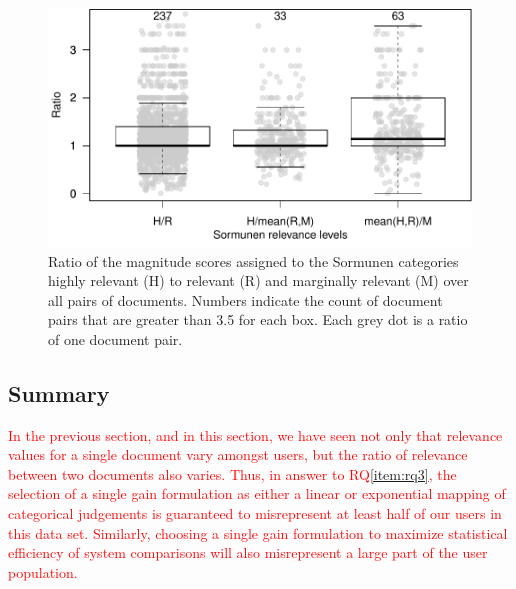 \begin{figure}[t]
  \centering
  \includegraphics[width=.7\linewidth]{figs/kanoulos_aslam.pdf}
  \caption{Ratio of the magnitude scores assigned to 
    the Sormunen categories highly relevant (H) to relevant (R) and marginally relevant
    (M) over all pairs of documents. Numbers indicate the count of document pairs that 
    are greater than 3.5 for each box. Each grey dot is a ratio of one document pair.
  \label{fig:ka}
    }
\end{figure}

\subsection{Summary}

\textcolor{red}{
In the previous section, and in this section, we have seen not only 
that relevance values for a single document vary amongst users, but
the ratio of relevance between two documents also varies.
Thus, in answer to RQ\ref{item:rq3}, the selection of a single 
gain formulation as either
a linear or exponential mapping of categorical judgements
is guaranteed to misrepresent at least half of our users 
in this data set.
Similarly, choosing a single gain formulation to maximize statistical 
efficiency of system comparisons will also misrepresent a large 
part of the user population.
}




